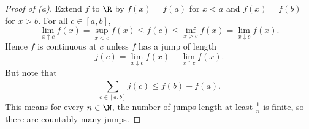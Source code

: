\documentclass[pmath451]{subfiles}
\begin{document}
    \begin{proof}[Proof of (a)]\qedplacedtrue
        Extend $f$ to $\R$ by $f\left( x \right)=f\left( a \right)$ for $x<a$ and $f\left( x \right)=f\left( b \right)$ for $x>b$. For all $c\in\left[ a,b \right]$,
        \begin{equation*}
            \lim_{x\uparrow c} f\left( x \right) = \sup_{x<c} f\left( x \right)\leq f\left( c \right) \leq \inf_{x>c} f\left( x \right) = \lim_{x\downarrow c} f\left( x \right).
        \end{equation*}
        Hence $f$ is continuous at $c$ unless $f$ has a jump of length
        \begin{equation*}
            j\left( c \right) = \lim_{x\downarrow c}f\left( x \right) - \lim_{x\uparrow c}f\left( x \right).
        \end{equation*}
        But note that
        \begin{equation*}
            \sum^{}_{c\in\left[ a,b \right]} j\left( c \right) \leq f\left( b \right)-f\left( a \right).
        \end{equation*}
        This means for every $n\in\N$, the number of jumps length at least $\frac{1}{n}$ is finite, so there are countably many jumps.
    \end{proof}
\end{document}
